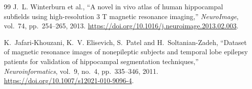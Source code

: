 \documentclass[12pt,a4paper]{article}
\begin{document}
\begin{thebibliography}{99}
J.~L. Winterburn et al., ``A novel in vivo atlas of human hippocampal
subfields using high-resolution 3 T magnetic resonance imaging,''
\emph{NeuroImage}, vol.~74, pp.~254--265, 2013.
\url{https://doi.org/10.1016/j.neuroimage.2013.02.003}.

K.~Jafari-Khouzani, K.~V. Elisevich, S.~Patel and H.~Soltanian-Zadeh,
``Dataset of magnetic resonance images of nonepileptic subjects and
temporal lobe epilepsy patients for validation of hippocampal
segmentation techniques,'' \emph{Neuroinformatics}, vol.~9, no.~4,
pp.~335--346, 2011. \url{https://doi.org/10.1007/s12021-010-9096-4}.

\end{thebibliography}

\clearpage
\appendix

\end{document}
